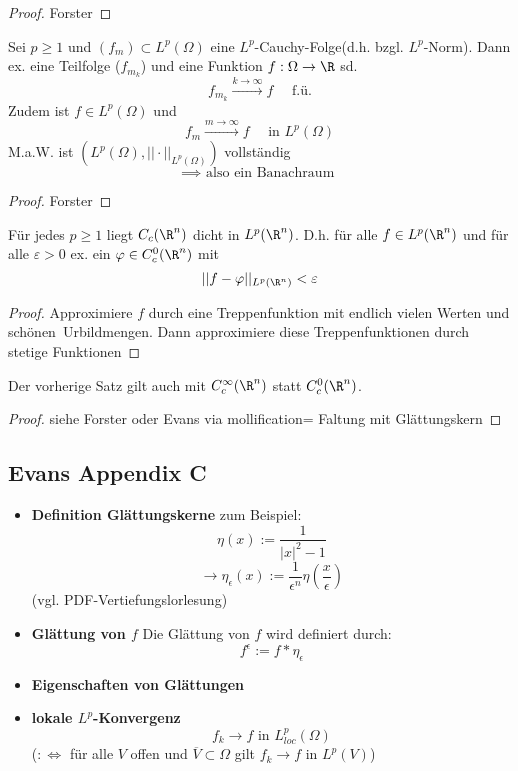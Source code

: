 \begin{proof}
	Forster
\end{proof}

\begin{satz} \enter
	Sei $p \geq 1$ und $(f_m) \subset L^p(\Omega)$ eine $L^p$-Cauchy-Folge(d.h.
	bzgl. $L^p$-Norm).\enter
	Dann ex. eine Teilfolge ($f_{m_k}$) und eine Funktion
	$f:\Omega\to \R$ sd. 
	\[f_{m_k} \overset{k\to \infty}{\longrightarrow} f \quad \text{ f.ü.}\]
	Zudem ist $f\in L^p(\Omega)$ und
	\[f_m \stackrel{m\rightarrow \infty}{\longrightarrow} f \quad \text{ in }
	L^p(\Omega)\]
	M.a.W. ist $\left(L^p(\Omega), ||\cdot||_{L^p(\Omega)}\right)$ vollst\"andig 
	\[\implies \text{ also ein Banachraum } \]
\end{satz}

\begin{proof}
	Forster
\end{proof}

\begin{satz} \enter
	Für jedes $p \geq 1$ liegt $C_c(\R^n)$ dicht in $L^p(\R^n)$. \enter
	D.h. für alle $f \in L^p(\R^n)$ und für alle $\varepsilon > 0$ ex. ein
	$\varphi \in C^0_c(\R^n)$ mit 
	\[||f-\varphi||_{ L^p(\R^n)} < \varepsilon\]
\end{satz}

\begin{proof}
	Approximiere $f$ durch eine Treppenfunktion mit endlich vielen Werten und \glqq sch\"onen\grqq\ Urbildmengen. Dann approximiere diese Treppenfunktionen durch stetige Funktionen
\end{proof}

\begin{satz}\enter
	Der vorherige Satz gilt auch mit $C^\infty_c(\R^n)$ statt $C^0_c(\R^n)$.
\end{satz}

\begin{proof}
	siehe Forster oder Evans via \glqq mollification\grqq = Faltung mit Glättungskern
\end{proof}


\subsection{Evans Appendix C}

\begin{itemize}
	\item \textbf{Definition Glättungskerne} \enter
		zum Beispiel:
		\[\eta(x):= \frac{1}{|x|^2-1}\]
		\[\rightarrow \eta_\epsilon(x):=\frac{1}{\epsilon^n}\eta\left(\frac{x}{\epsilon}\right)\]
			(vgl. PDF-Vertiefungslorlesung)
		\item \textbf{Glättung von $f$} \enter
			Die Glättung von $f$ wird definiert durch:
			\[f^\epsilon:=f\ast\eta_\epsilon\]
		\item \textbf{Eigenschaften von Glättungen}
			\newpage
		\item \textbf{lokale $L^p$-Konvergenz}\enter
			\[f_k \rightarrow f \text{ in } L^p_{loc}(\Omega)\]
			($:\iff$ für alle $V$ offen und $\overline{V}\subset\Omega$ gilt
				$f_k\rightarrow f \text{ in } L^p(V)$)
\end{itemize}
